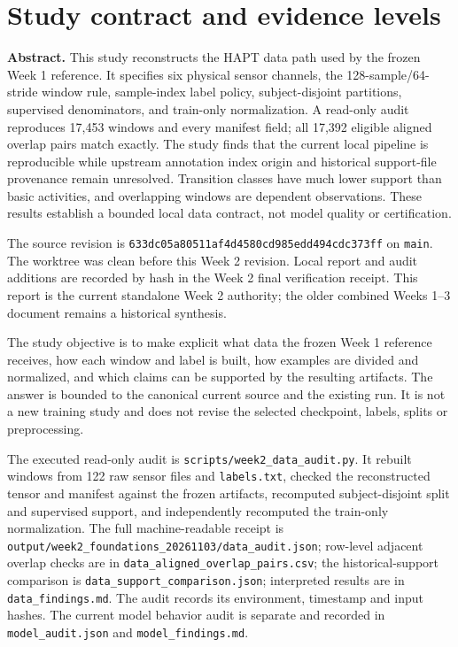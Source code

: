 \documentclass[11pt,a4paper]{article}
\newcommand{\code}[1]{{\small\ttfamily\nolinkurl{#1}}}
\begin{document}
\section{Study contract and evidence levels}
\textbf{Abstract.} This study reconstructs the HAPT data path used by the frozen Week 1 reference. It specifies six physical sensor channels, the 128-sample/64-stride window rule, sample-index label policy, subject-disjoint partitions, supervised denominators, and train-only normalization. A read-only audit reproduces 17,453 windows and every manifest field; all 17,392 eligible aligned overlap pairs match exactly. The study finds that the current local pipeline is reproducible while upstream annotation index origin and historical support-file provenance remain unresolved. Transition classes have much lower support than basic activities, and overlapping windows are dependent observations. These results establish a bounded local data contract, not model quality or certification.

The source revision is \code{633dc05a80511af4d4580cd985edd494cdc373ff} on \code{main}. The worktree was clean before this Week 2 revision. Local report and audit additions are recorded by hash in the Week 2 final verification receipt. This report is the current standalone Week 2 authority; the older combined Weeks 1--3 document remains a historical synthesis.

The study objective is to make explicit what data the frozen Week 1 reference receives, how each window and label is built, how examples are divided and normalized, and which claims can be supported by the resulting artifacts. The answer is bounded to the canonical current source and the existing run. It is not a new training study and does not revise the selected checkpoint, labels, splits or preprocessing.

The executed read-only audit is \code{scripts/week2_data_audit.py}. It rebuilt windows from 122 raw sensor files and \code{labels.txt}, checked the reconstructed tensor and manifest against the frozen artifacts, recomputed subject-disjoint split and supervised support, and independently recomputed the train-only normalization. The full machine-readable receipt is \code{output/week2_foundations_20261103/data_audit.json}; row-level adjacent overlap checks are in \code{data_aligned_overlap_pairs.csv}; the historical-support comparison is \code{data_support_comparison.json}; interpreted results are in \code{data_findings.md}. The audit records its environment, timestamp and input hashes. The current model behavior audit is separate and recorded in \code{model_audit.json} and \code{model_findings.md}.
\end{document}
